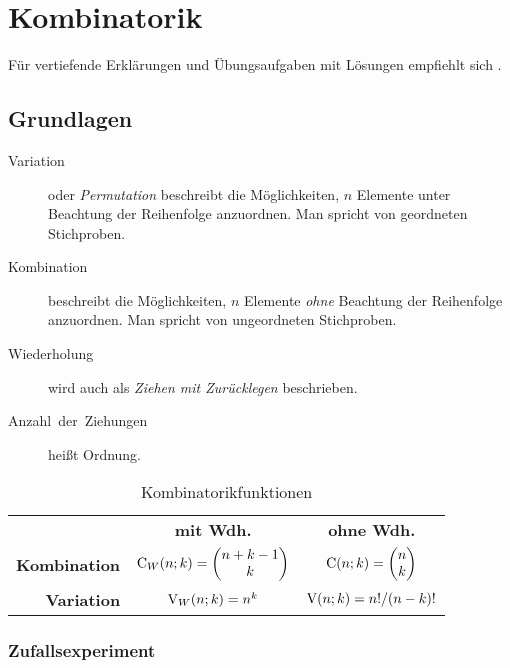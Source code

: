 \chapter{Kombinatorik}

Für vertiefende Erklärungen und Übungsaufgaben mit Lösungen empfiehlt sich \cite{Papula3}.


\section{Grundlagen}
\begin{description}
  \item [{Variation}] 
	oder \emph{Permutation} beschreibt die Möglichkeiten, $n$ Elemente unter Beachtung der Reihenfolge anzuordnen.
	Man spricht von geordneten Stichproben.
  \item [{Kombination}] 
	beschreibt die Möglichkeiten, $n$ Elemente \emph{ohne} Beachtung der Reihenfolge anzuordnen.
	Man spricht von ungeordneten Stichproben.
  \item [{Wiederholung}] 
	wird auch als \emph{Ziehen mit Zurücklegen} beschrieben.
  \item [{Anzahl~der~Ziehungen}] 
	heißt Ordnung.
\end{description}
\begin{table}[htb]
\centering{}%
\begin{tabular}{rcc}
    & \bfseries mit Wdh.
    & \bfseries ohne Wdh. \\
  \bfseries Kombination
    & $\hbox{C}_{W}(n;k) = \vecc(n+k-1;k)$
    & $\hbox{C}(n;k) = \vecc(n;k)$ \\[1.6667em]
  \bfseries Variation
    & $\hbox{V}_{W}(n;k)=n^k$
    & $\hbox{V}(n;k) = n! / (n-k)!$
\end{tabular}
\caption{Kombinatorikfunktionen}
\end{table}



\subsection{Zufallsexperiment}

